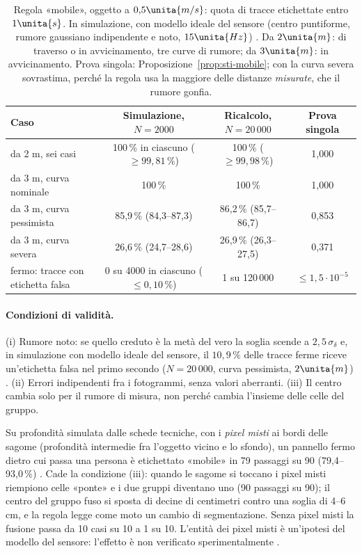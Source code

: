 \begin{table}[H]\centering\footnotesize
\caption{Regola «mobile», oggetto a $0{,}5\unita{m/s}$: quota di tracce etichettate entro $1\unita{s}$. In simulazione, con modello ideale del sensore (centro puntiforme, rumore gaussiano indipendente e noto, $15\unita{Hz}$) . Da $2\unita{m}$: di traverso o in avvicinamento, tre curve di rumore; da $3\unita{m}$: in avvicinamento. Prova singola: Proposizione~\ref{prop:sti-mobile}; con la curva severa sovrastima, perché la regola usa la maggiore delle distanze \emph{misurate}, che il rumore gonfia.}\label{tab:sti-mobile}
\begin{tabular}{lccc}
\toprule
Caso & Simulazione, $N=2000$ & Ricalcolo, $N=20\,000$ & Prova singola\\
\midrule
da 2 m, sei casi & 100\,\% in ciascuno ($\ge99{,}81\,\%$) & 100\,\% ($\ge99{,}98\,\%$) & 1,000\\
da 3 m, curva nominale & 100\,\% & 100\,\% & 1,000\\
da 3 m, curva pessimista & 85,9\,\% (84,3--87,3) & 86,2\,\% (85,7--86,7) & 0,853\\
da 3 m, curva severa & 26,6\,\% (24,7--28,6) & 26,9\,\% (26,3--27,5) & 0,371\\
fermo: tracce con etichetta falsa & 0 su 4000 in ciascuno ($\le0{,}10\,\%$) & 1 su 120\,000 & $\le1{,}5\cdot10^{-5}$\\
\bottomrule
\end{tabular}
\end{table}
\paragraph{Condizioni di validità.} (i) Rumore noto: se quello creduto è la metà del vero la soglia scende a $2{,}5\,\sigma_\delta$ e, in simulazione con modello ideale del sensore, il $10{,}9\,\%$ delle tracce ferme riceve un'etichetta falsa nel primo secondo ($N=20\,000$, curva pessimista, $2\unita{m}$) . (ii) Errori indipendenti fra i fotogrammi, senza valori aberranti. (iii) Il centro cambia solo per il rumore di misura, non perché cambia l'insieme delle celle del gruppo.

\begin{controesempio}\label{ctr:sti-misti}
Su profondità simulata dalle schede tecniche, con i \emph{pixel misti} ai bordi delle sagome (profondità intermedie fra l'oggetto vicino e lo sfondo), un pannello fermo dietro cui passa una persona è etichettato «mobile» in 79 passaggi su 90 (79,4--93,0\,\%) . Cade la condizione (iii): quando le sagome si toccano i pixel misti riempiono celle «ponte» e i due gruppi diventano uno (90 passaggi su 90); il centro del gruppo fuso si sposta di decine di centimetri contro una soglia di 4--6\,cm, e la regola legge come moto un cambio di segmentazione. Senza pixel misti la fusione passa da 10 casi su 10 a 1 su 10. L'entità dei pixel misti è un'ipotesi del modello del sensore: l'effetto è non verificato sperimentalmente .
\end{controesempio}

